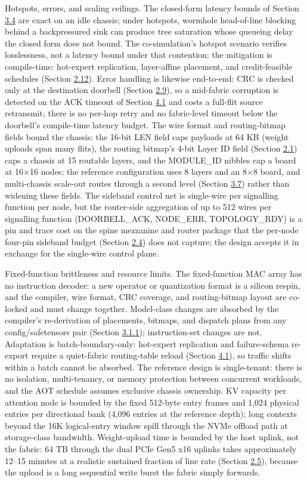 \documentclass[12pt,onecolumn]{article}
\begin{document}
Hotspots, errors, and scaling ceilings. The closed-form latency bounds of Section \hyperref[sec:3.4]{3.4} are exact on an idle chassis; under hotspots, wormhole head-of-line blocking behind a backpressured sink can produce tree saturation whose queueing delay the closed form does not bound. The co-simulation's hotspot scenario verifies losslessness, not a latency bound under that contention; the mitigation is compile-time: hot-expert replication, layer-affine placement, and credit-feasible schedules (Section \hyperref[sec:2.12]{2.12}). Error handling is likewise end-to-end: CRC is checked only at the destination doorbell (Section \hyperref[sec:2.9]{2.9}), so a mid-fabric corruption is detected on the ACK timeout of Section \hyperref[sec:4.1]{4.1} and costs a full-flit source retransmit; there is no per-hop retry and no fabric-level timeout below the doorbell's compile-time latency budget. The wire format and routing-bitmap fields bound the chassis: the 16-bit LEN field caps payloads at 64 KB (weight uploads span many flits), the routing bitmap's 4-bit Layer ID field (Section \hyperref[sec:2.1]{2.1}) caps a chassis at 15 routable layers, and the MODULE\_ID nibbles cap a board at 16$\times$16 nodes; the reference configuration uses 8 layers and an 8$\times$8 board, and multi-chassis scale-out routes through a second level (Section \hyperref[sec:3.7]{3.7}) rather than widening these fields. The sideband control net is single-wire per signalling function per node, but the router-side aggregation of up to 512 wires per signalling function (DOORBELL\_ACK, NODE\_ERR, TOPOLOGY\_RDY) is a pin and trace cost on the spine mezzanine and router package that the per-node four-pin sideband budget (Section \hyperref[sec:2.4]{2.4}) does not capture; the design accepts it in exchange for the single-wire control plane.

Fixed-function brittleness and resource limits. The fixed-function MAC array has no instruction decoder: a new operator or quantization format is a silicon respin, and the compiler, wire format, CRC coverage, and routing-bitmap layout are co-locked and must change together. Model-class changes are absorbed by the compiler's re-derivation of placements, bitmaps, and dispatch plans from any config/safetensors pair (Section \hyperref[sec:3.1.1]{3.1.1}); instruction-set changes are not. Adaptation is batch-boundary-only: hot-expert replication and failure-schema re-export require a quiet-fabric routing-table reload (Section \hyperref[sec:4.1]{4.1}), so traffic shifts within a batch cannot be absorbed. The reference design is single-tenant: there is no isolation, multi-tenancy, or memory protection between concurrent workloads, and the AOT schedule assumes exclusive chassis ownership. KV capacity per attention node is bounded by the fixed 512-byte entry frames and 1,024 physical entries per directional bank (4,096 entries at the reference depth); long contexts beyond the 16K logical-entry window spill through the NVMe offload path at storage-class bandwidth. Weight-upload time is bounded by the host uplink, not the fabric: 64 TB through the dual PCIe Gen5 x16 uplinks takes approximately 12--15 minutes at a realistic sustained fraction of line rate (Section \hyperref[sec:2.5]{2.5}), because the upload is a long sequential write burst the fabric simply forwards.
\end{document}
